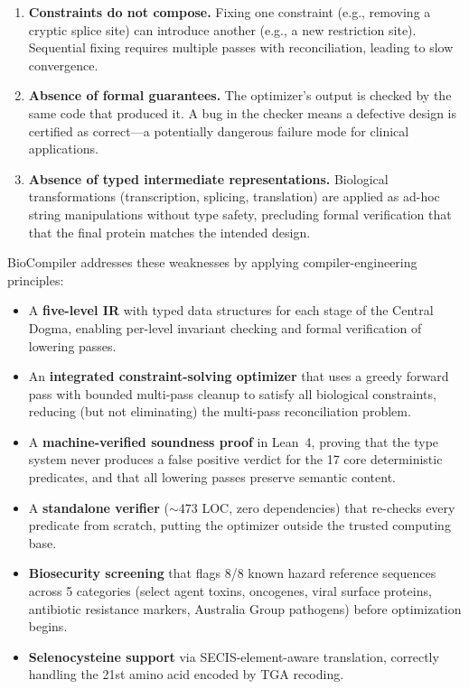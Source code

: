 \documentclass[11pt,a4paper]{article}
\theoremstyle{definition}
\begin{document}
\begin{enumerate}[leftmargin=*,itemsep=1pt]
\item \textbf{Constraints do not compose.} Fixing one constraint (e.g., removing a cryptic splice site) can introduce another (e.g., a new restriction site). Sequential fixing requires multiple passes with reconciliation, leading to slow convergence.
\item \textbf{Absence of formal guarantees.} The optimizer's output is checked by the same code that produced it. A bug in the checker means a defective design is certified as correct---a potentially dangerous failure mode for clinical applications.
\item \textbf{Absence of typed intermediate representations.} Biological transformations (transcription, splicing, translation) are applied as ad-hoc string manipulations without type safety, precluding formal verification that that the final protein matches the intended design.
\end{enumerate}

BioCompiler addresses these weaknesses by applying compiler-engineering principles:

\begin{itemize}[leftmargin=*,itemsep=1pt]
\item A \textbf{five-level IR} with typed data structures for each stage of the Central Dogma, enabling per-level invariant checking and formal verification of lowering passes.
\item An \textbf{integrated constraint-solving optimizer} that uses a greedy forward pass with bounded multi-pass cleanup to satisfy all biological constraints, reducing (but not eliminating) the multi-pass reconciliation problem.
\item A \textbf{machine-verified soundness proof} in Lean~4, proving that the type system never produces a false positive verdict for the 17 core deterministic predicates, and that all lowering passes preserve semantic content.
\item A \textbf{standalone verifier} ($\sim$473 LOC, zero dependencies) that re-checks every predicate from scratch, putting the optimizer outside the trusted computing base.
\item \textbf{Biosecurity screening} that flags 8/8 known hazard reference sequences across 5 categories (select agent toxins, oncogenes, viral surface proteins, antibiotic resistance markers, Australia Group pathogens) before optimization begins.
\item \textbf{Selenocysteine support} via SECIS-element-aware translation, correctly handling the 21st amino acid encoded by TGA recoding.
\end{itemize}
\end{document}

